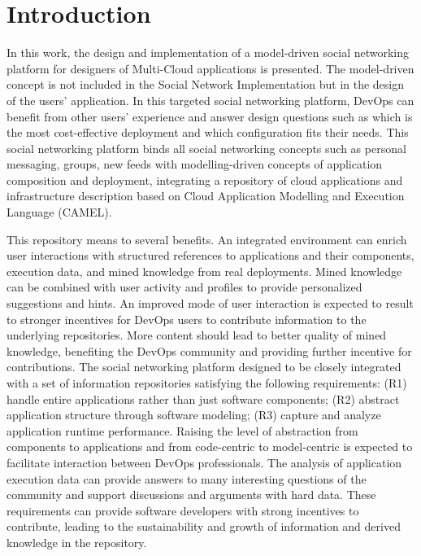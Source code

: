 \chapter{Introduction}
In this work, the design and implementation of a model-driven social networking platform for designers of Multi-Cloud applications is presented. The model-driven concept is not included in the Social Network Implementation but in the design of the users' application. In this targeted social networking platform, DevOps can benefit from other users' experience and answer design questions such as which is the most cost-effective deployment and which configuration fits their needs. This social networking platform binds all social networking concepts such as personal messaging, groups, new feeds with modelling-driven concepts of application composition and deployment, integrating a repository of cloud applications and infrastructure description based on Cloud Application Modelling and Execution Language (CAMEL). 

This repository means to several benefits. 
An integrated environment can enrich user interactions with structured references to applications and their components, execution data, and mined knowledge from real deployments. Mined knowledge can be combined with user activity and profiles to provide personalized suggestions and hints.  An improved mode of user interaction is expected to result to stronger incentives for DevOps users to contribute information to the underlying repositories. More content should lead to better quality of mined knowledge, benefiting the DevOps community and providing further incentive for contributions.  The social networking platform designed to be closely integrated with a set of information repositories satisfying the following requirements: 
(R1) handle entire applications rather than just software components; (R2) abstract application structure through software modeling; (R3) capture and analyze application runtime performance. Raising the level of abstraction from components to applications and from code-centric to model-centric is expected to facilitate interaction between DevOps professionals. The analysis of application execution data can provide answers to many interesting questions of the community and
support discussions and arguments with hard data. 
These requirements can provide software developers with strong incentives to contribute, leading to the sustainability and growth of information and derived knowledge in the repository.


